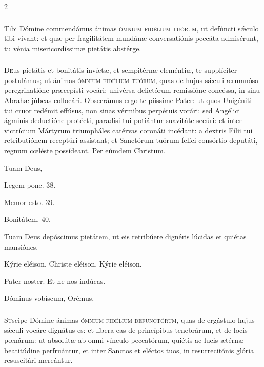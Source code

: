 \documentclass[9pt,twoside]{extarticle}
\begin{document}
\begin{multicols}{2}
\subsubsection*{\center {}}
\lettrine{T}ibi Dómine commendámus ánimas \textsc{ómnium fidélium tuórum}, ut defúncti sǽculo tibi vivant: et quæ per fragilitátem mundánæ conversatiónis peccáta admisérunt, tu vénia misericordíssimæ pietátis abstérge.

\subsubsection*{\center {}}
\lettrine{D}eus pietátis et bonitátis invíctæ, et sempitérnæ cleméntiæ, te supplíciter postulámus; ut ánimas \textsc{ómnium fidélium tuórum}, quas de hujus sǽculi ærumnósa peregrinatióne præcepísti vocári; univérsa delictórum remissióne concéssa, in sinu Abrahæ júbeas collocári. Obsecrámus ergo te piíssime Pater: ut quos Unigéniti tui cruor redémit effúsus, non sinas vérmibus perpétuis vorári: sed Angélici ágminis deductióne protécti, paradísi tui potiántur suavitáte secúri: et inter victrícium Mártyrum triumpháles catérvas coronáti incédant: a dextris Fílii tui retributiónem receptúri assístant; et Sanctórum tuórum felíci consórtio deputáti, regnum cœléste possídeant. Per eúmdem Christum.

\begin{tightlist}{}
\item {} Tuam Deus, 
\item {} Legem pone. 38.
\item {} Memor esto. 39.
\item {} Bonitátem. 40.
\item {} Tuam Deus depóscimus pietátem, ut eis retribúere dignéris lúcidas et quiétas mansiónes.
\item Kýrie eléison. Christe eléison. Kýrie eléison.
\item Pater noster. Et ne nos indúcas.
\item {} Dóminus vobíscum,  Orémus, 
\end{tightlist}

\subsubsection*{\center {}}
\lettrine{S}uscipe Dómine ánimas \textsc{ómnium fidélium defunctórum}, quas de ergástulo hujus sǽculi vocáre dignátus es: et líbera eas de princípibus tenebrárum, et de locis pœnárum: ut absolútæ ab omni vínculo peccatórum, quiétis ac lucis ætérnæ beatitúdine perfruántur, et inter Sanctos et eléctos tuos, in resurrecitónis glória resuscitári mereántur.


\end{multicols}
\end{document}
